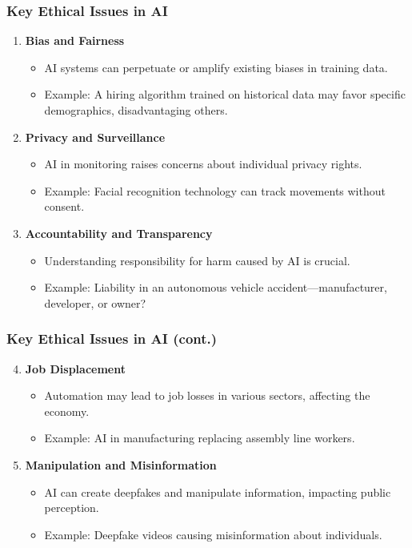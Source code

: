 \documentclass{beamer}
\begin{document}
\begin{frame}[fragile]
    \frametitle{Key Ethical Issues in AI}
    \begin{enumerate}
        \item \textbf{Bias and Fairness}
            \begin{itemize}
                \item AI systems can perpetuate or amplify existing biases in training data.
                \item Example: A hiring algorithm trained on historical data may favor specific demographics, disadvantaging others.
            \end{itemize}
        \item \textbf{Privacy and Surveillance}
            \begin{itemize}
                \item AI in monitoring raises concerns about individual privacy rights.
                \item Example: Facial recognition technology can track movements without consent.
            \end{itemize}
        \item \textbf{Accountability and Transparency}
            \begin{itemize}
                \item Understanding responsibility for harm caused by AI is crucial.
                \item Example: Liability in an autonomous vehicle accident—manufacturer, developer, or owner?
            \end{itemize}
    \end{enumerate}
\end{frame}

\begin{frame}[fragile]
    \frametitle{Key Ethical Issues in AI (cont.)}
    \begin{enumerate}
        \setcounter{enumi}{3} %
        \item \textbf{Job Displacement}
            \begin{itemize}
                \item Automation may lead to job losses in various sectors, affecting the economy.
                \item Example: AI in manufacturing replacing assembly line workers.
            \end{itemize}
        \item \textbf{Manipulation and Misinformation}
            \begin{itemize}
                \item AI can create deepfakes and manipulate information, impacting public perception.
                \item Example: Deepfake videos causing misinformation about individuals.
            \end{itemize}
    \end{enumerate}
\end{frame}
\end{document}
